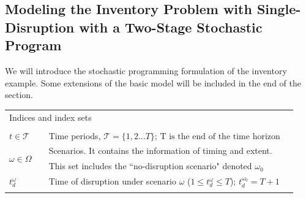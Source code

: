 \documentclass[11pt]{article}
\newcommand{\ms}{\medskip}
\begin{document}
	\subsection{Modeling the Inventory Problem with Single-Disruption with a Two-Stage Stochastic Program}
		We will introduce the stochastic programming formulation of the inventory example. Some extensions of the basic model will be included in the end of the section. 
		\begin{table}[H]
			\begin{tabular}{ l l l l }
				\\
				\multicolumn{4}{l}{Indices and index sets} \\
				\\
				\(t \in \mathscr{T}\)  & \qquad & Time periods, \(\mathscr{T} = \{1, 2 \dots T\} \text{; T is the end of the time horizon}\)& \ms \\ 
				\multirow{2}{*}{\(\omega \in \Omega\)} & \qquad & Scenarios. It contains the information of timing and extent. \\ & \qquad &This set includes the ``no-disruption scenario" denoted \(\omega_0\)& \ms\\
				\(t_d^\omega\) & \qquad & Time of disruption under scenario \(\omega\) (\(1\leq t_d^\omega \leq T\)); \(t_d^{\omega_0} = T+1\)&\\
				\\
				

\end{tabular}
\end{table}
\end{document}
